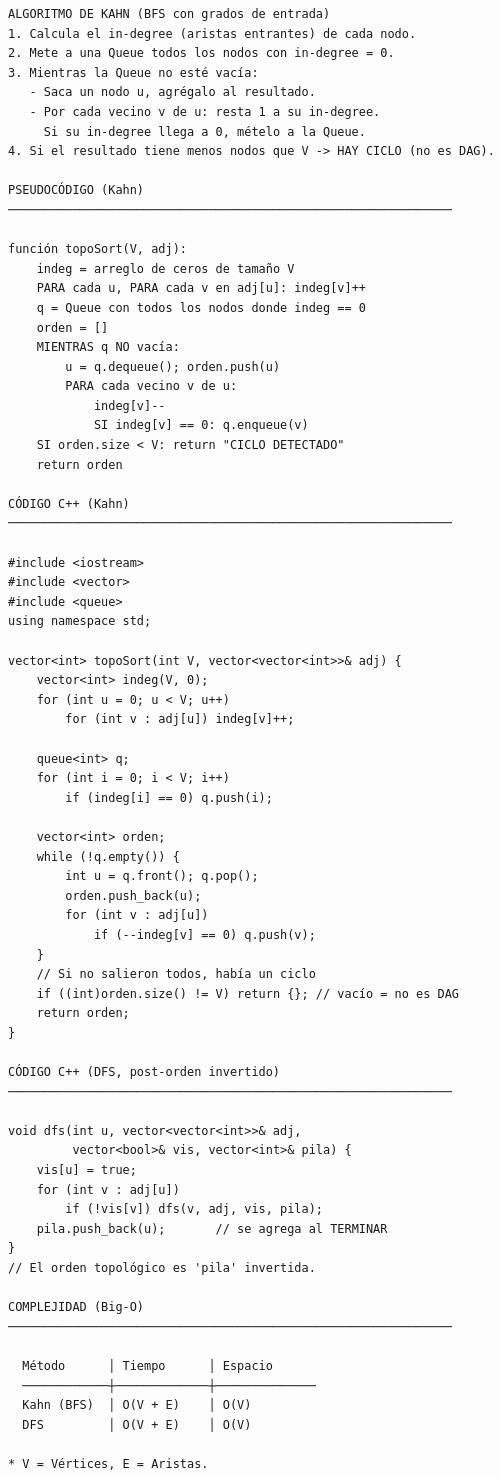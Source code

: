 \begin{lstlisting}
ALGORITMO DE KAHN (BFS con grados de entrada)
1. Calcula el in-degree (aristas entrantes) de cada nodo.
2. Mete a una Queue todos los nodos con in-degree = 0.
3. Mientras la Queue no esté vacía:
   - Saca un nodo u, agrégalo al resultado.
   - Por cada vecino v de u: resta 1 a su in-degree.
     Si su in-degree llega a 0, mételo a la Queue.
4. Si el resultado tiene menos nodos que V -> HAY CICLO (no es DAG).

PSEUDOCÓDIGO (Kahn)
──────────────────────────────────────────────────────────────

función topoSort(V, adj):
    indeg = arreglo de ceros de tamaño V
    PARA cada u, PARA cada v en adj[u]: indeg[v]++
    q = Queue con todos los nodos donde indeg == 0
    orden = []
    MIENTRAS q NO vacía:
        u = q.dequeue(); orden.push(u)
        PARA cada vecino v de u:
            indeg[v]--
            SI indeg[v] == 0: q.enqueue(v)
    SI orden.size < V: return "CICLO DETECTADO"
    return orden

CÓDIGO C++ (Kahn)
──────────────────────────────────────────────────────────────

#include <iostream>
#include <vector>
#include <queue>
using namespace std;

vector<int> topoSort(int V, vector<vector<int>>& adj) {
    vector<int> indeg(V, 0);
    for (int u = 0; u < V; u++)
        for (int v : adj[u]) indeg[v]++;

    queue<int> q;
    for (int i = 0; i < V; i++)
        if (indeg[i] == 0) q.push(i);

    vector<int> orden;
    while (!q.empty()) {
        int u = q.front(); q.pop();
        orden.push_back(u);
        for (int v : adj[u])
            if (--indeg[v] == 0) q.push(v);
    }
    // Si no salieron todos, había un ciclo
    if ((int)orden.size() != V) return {}; // vacío = no es DAG
    return orden;
}

CÓDIGO C++ (DFS, post-orden invertido)
──────────────────────────────────────────────────────────────

void dfs(int u, vector<vector<int>>& adj,
         vector<bool>& vis, vector<int>& pila) {
    vis[u] = true;
    for (int v : adj[u])
        if (!vis[v]) dfs(v, adj, vis, pila);
    pila.push_back(u);       // se agrega al TERMINAR
}
// El orden topológico es 'pila' invertida.

COMPLEJIDAD (Big-O)
──────────────────────────────────────────────────────────────

  Método      │ Tiempo      │ Espacio
  ────────────┼─────────────┼──────────────
  Kahn (BFS)  │ O(V + E)    │ O(V)
  DFS         │ O(V + E)    │ O(V)

* V = Vértices, E = Aristas.
\end{lstlisting}

